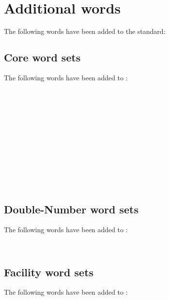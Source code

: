 
\section{Additional words} %
\label{diff:new12}

The following words have been added to the standard:

\setcounter{subsection}{5}
\subsection{Core word sets}
The following words have been added to :

\begin{minipage}[t]{0.3\linewidth}
	 \\
	 \\
	\\
\end{minipage}
\hfill
\begin{minipage}[t]{0.3\linewidth}
	 \\
	 \\
	\\
\end{minipage}
\hfill
\begin{minipage}[t]{0.3\linewidth}
	 \\
	 \\
	\\
\end{minipage}



\subsection{Double-Number word sets}
The following words have been added to :

\\


\subsection{Facility word sets}
The following words have been added to :

